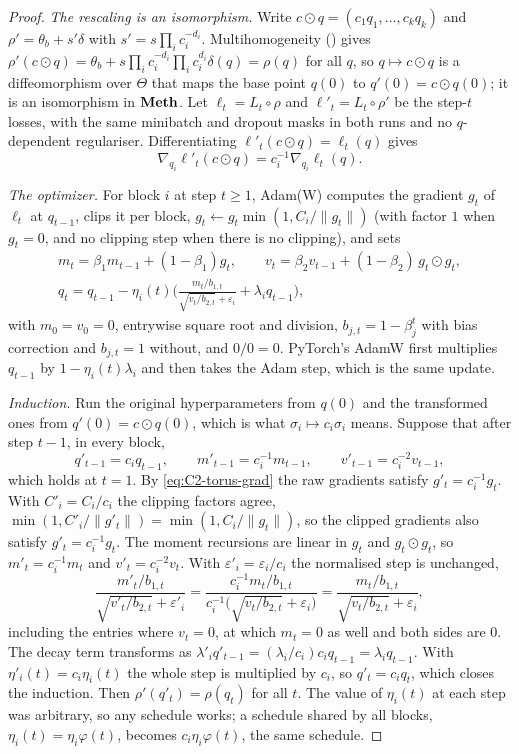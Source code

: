 \begin{proof}
\emph{The rescaling is an isomorphism.} Write $c\odot q=(c_1q_1,\dots,c_kq_k)$ and $\rho'=\theta_b+s'\delta$ with
$s'=s\prod_ic_i^{-d_i}$. Multihomogeneity () gives
$\rho'(c\odot q)=\theta_b+s\prod_ic_i^{-d_i}\prod_ic_i^{d_i}\delta(q)=\rho(q)$ for all $q$, so $q\mapsto c\odot q$ is a
diffeomorphism over $\Theta$ that maps the base point $q(0)$ to $q'(0)=c\odot q(0)$; it is an isomorphism in $\mathbf{Meth}$. Let
$\ell_t=L_t\circ\rho$ and $\ell'_t=L_t\circ\rho'$ be the step-$t$ losses, with the same minibatch and dropout masks in
both runs and no $q$-dependent regulariser. Differentiating $\ell'_t(c\odot q)=\ell_t(q)$ gives
\begin{equation}\label{eq:C2-torus-grad}
\nabla_{q_i}\ell'_t(c\odot q)=c_i^{-1}\nabla_{q_i}\ell_t(q).
\end{equation}

\emph{The optimizer.} For block $i$ at step $t\ge1$, Adam(W) computes the gradient $g_t$ of $\ell_t$ at $q_{t-1}$, clips it
per block, $g_t\leftarrow g_t\min(1,C_i/\lVert g_t\rVert)$ (with factor $1$ when $g_t=0$, and no clipping step when there
is no clipping), and sets
\begin{gather*}
m_t=\beta_1m_{t-1}+(1-\beta_1)g_t,\qquad v_t=\beta_2v_{t-1}+(1-\beta_2)\,g_t\odot g_t,\\
q_t=q_{t-1}-\eta_i(t)\Big(\frac{m_t/b_{1,t}}{\sqrt{v_t/b_{2,t}}+\varepsilon_i}+\lambda_iq_{t-1}\Big),
\end{gather*}
with $m_0=v_0=0$, entrywise square root and division, $b_{j,t}=1-\beta_j^t$ with bias correction and $b_{j,t}=1$ without,
and $0/0=0$. PyTorch's AdamW first multiplies $q_{t-1}$ by $1-\eta_i(t)\lambda_i$ and then takes the Adam step, which is the
same update.

\emph{Induction.} Run the original hyperparameters from $q(0)$ and the transformed ones from $q'(0)=c\odot q(0)$, which is
what $\sigma_i\mapsto c_i\sigma_i$ means. Suppose that after step $t-1$, in every block,
\[q'_{t-1}=c_iq_{t-1},\qquad m'_{t-1}=c_i^{-1}m_{t-1},\qquad v'_{t-1}=c_i^{-2}v_{t-1},\]
which holds at $t=1$. By \eqref{eq:C2-torus-grad} the raw gradients satisfy $g'_t=c_i^{-1}g_t$. With $C'_i=C_i/c_i$ the
clipping factors agree, $\min(1,C'_i/\lVert g'_t\rVert)=\min(1,C_i/\lVert g_t\rVert)$, so the clipped gradients also satisfy
$g'_t=c_i^{-1}g_t$. The moment recursions are linear in $g_t$ and $g_t\odot g_t$, so $m'_t=c_i^{-1}m_t$ and
$v'_t=c_i^{-2}v_t$. With $\varepsilon'_i=\varepsilon_i/c_i$ the normalised step is unchanged,
\[\frac{m'_t/b_{1,t}}{\sqrt{v'_t/b_{2,t}}+\varepsilon'_i}=\frac{c_i^{-1}m_t/b_{1,t}}{c_i^{-1}\big(\sqrt{v_t/b_{2,t}}+\varepsilon_i\big)}=\frac{m_t/b_{1,t}}{\sqrt{v_t/b_{2,t}}+\varepsilon_i},\]
including the entries where $v_t=0$, at which $m_t=0$ as well and both sides are $0$. The decay term transforms as
$\lambda'_iq'_{t-1}=(\lambda_i/c_i)c_iq_{t-1}=\lambda_iq_{t-1}$. With $\eta'_i(t)=c_i\eta_i(t)$ the whole step is multiplied
by $c_i$, so $q'_t=c_iq_t$, which closes the induction. Then $\rho'(q'_t)=\rho(q_t)$ for all $t$. The value of $\eta_i(t)$
at each step was arbitrary, so any schedule works; a schedule shared by all blocks, $\eta_i(t)=\eta_i\varphi(t)$, becomes
$c_i\eta_i\varphi(t)$, the same schedule.


\end{proof}
